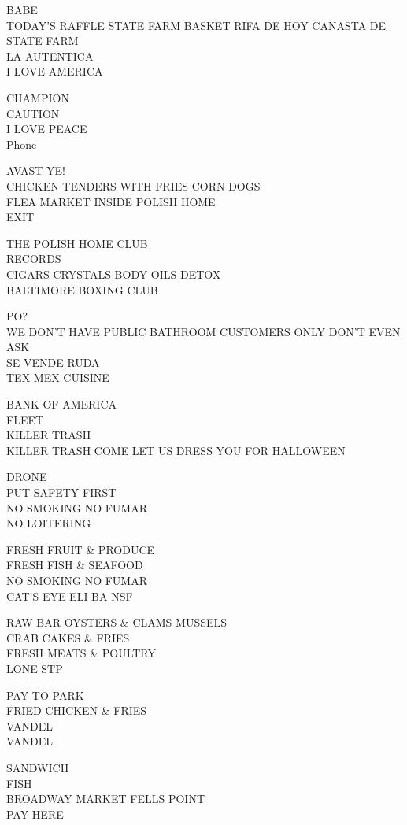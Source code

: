 \documentclass[10pt,letterpaper]{article}
\begin{document}
BABE\\
TODAY'S RAFFLE STATE FARM BASKET RIFA DE HOY CANASTA DE STATE FARM\\
LA AUTENTICA\\
I LOVE AMERICA

CHAMPION\\
CAUTION\\
I LOVE PEACE\\
Phone

AVAST YE!\\
CHICKEN TENDERS WITH FRIES CORN DOGS\\
FLEA MARKET INSIDE POLISH HOME\\
EXIT

THE POLISH HOME CLUB\\
RECORDS\\
CIGARS CRYSTALS BODY OILS DETOX\\
BALTIMORE BOXING CLUB

PO?\\
WE DON'T HAVE PUBLIC BATHROOM CUSTOMERS ONLY DON'T EVEN ASK\\
SE VENDE RUDA\\
TEX MEX CUISINE

BANK OF AMERICA\\
FLEET\\
KILLER TRASH\\
KILLER TRASH COME LET US DRESS YOU FOR HALLOWEEN

DRONE\\
PUT SAFETY FIRST\\
NO SMOKING NO FUMAR\\
NO LOITERING

FRESH FRUIT \& PRODUCE\\
FRESH FISH \& SEAFOOD\\
NO SMOKING NO FUMAR\\
CAT'S EYE ELI BA NSF

RAW BAR OYSTERS \& CLAMS MUSSELS\\
CRAB CAKES \& FRIES\\
FRESH MEATS \& POULTRY\\
LONE STP

PAY TO PARK\\
FRIED CHICKEN \& FRIES\\
VANDEL\\
VANDEL

SANDWICH\\
FISH\\
BROADWAY MARKET FELLS POINT\\
PAY HERE
\end{document}
